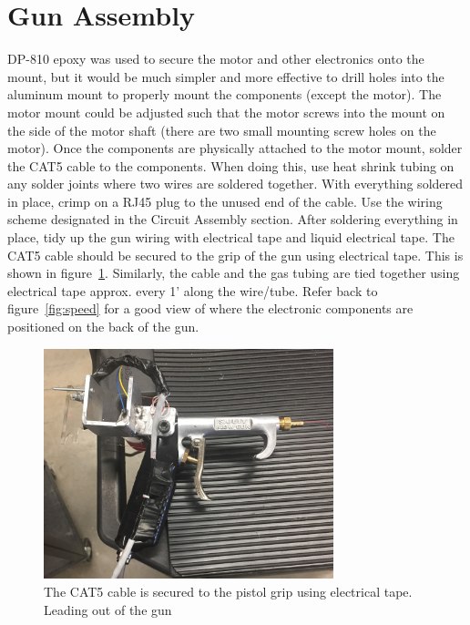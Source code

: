 \documentclass[letterpaper,12pt]{article}
\begin{document}
\section{Gun Assembly}
DP-810 epoxy was used to secure the motor and other electronics onto the mount, but it would be much simpler and more effective to drill holes into the aluminum mount to properly mount the components (except the motor). The motor mount could be adjusted such that the motor screws into the mount on the side of the motor shaft (there are two small mounting screw holes on the motor). Once the components are physically attached to the motor mount, solder the CAT5 cable to the components. When doing this, use heat shrink tubing on any solder joints where two wires are soldered together. With everything soldered in place, crimp on a RJ45 plug to the unused end of the cable. Use the wiring scheme designated in the Circuit Assembly section. After soldering everything in place, tidy up the gun wiring with electrical tape and liquid electrical tape. The CAT5 cable should be secured to the grip of the gun using electrical tape. This is shown in figure~\ref{fig:gun_wire}. Similarly, the cable and the gas tubing are tied together using electrical tape approx. every 1' along the wire/tube. Refer back to figure~\ref{fig:speed} for a good view of where the electronic components are positioned on the back of the gun.
\begin{figure} [h!]
		\centering
		\includegraphics[width=0.75\textwidth]{gun_thread_down.JPG}
		\caption{The CAT5 cable is secured to the pistol grip using electrical tape. Leading out of the gun}
		\label{fig:gun_wire}
\end{figure}
\end{document}
